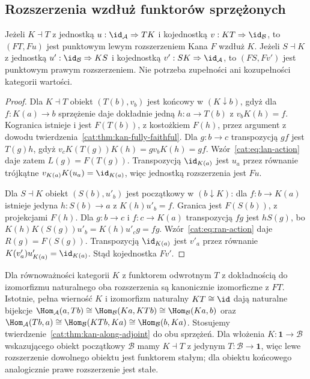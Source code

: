\subsection{Rozszerzenia wzdłuż funktorów sprzężonych}
\begin{twierdzenie}\label{cat:thm:kan-along-adjoint}
Jeżeli $K\dashv T$ z jednostką $u:\id_{\mathcal A}\Rightarrow TK$ i kojednostką $v:KT\Rightarrow\id_{\mathcal B}$, to $(FT,Fu)$ jest punktowym lewym rozszerzeniem Kana $F$ wzdłuż $K$. Jeżeli $S\dashv K$ z jednostką $u':\id_{\mathcal B}\Rightarrow KS$ i kojednostką $v':SK\Rightarrow\id_{\mathcal A}$, to $(FS,Fv')$ jest punktowym prawym rozszerzeniem. Nie potrzeba zupełności ani kozupełności kategorii wartości.
\end{twierdzenie}
\begin{proof}
Dla $K\dashv T$ obiekt $(T(b),v_b)$ jest końcowy w $(K\downarrow b)$, gdyż dla $f:K(a)\to b$ sprzężenie daje dokładnie jedną $h:a\to T(b)$ z $v_bK(h)=f$. Kogranica istnieje i jest $F(T(b))$, z kostożkiem $F(h)$, przez argument z dowodu twierdzenia~\ref{cat:thm:kan-fully-faithful}. Dla $g:b\to c$ transpozycją $gf$ jest $T(g)h$, gdyż $v_cK(T(g))K(h)=gv_bK(h)=gf$. Wzór~\eqref{cat:eq:lan-action} daje zatem $L(g)=F(T(g))$. Transpozycją $\id_{K(a)}$ jest $u_a$ przez równanie trójkątne $v_{K(a)}K(u_a)=\id_{K(a)}$, więc jednostką rozszerzenia jest $Fu$.

Dla $S\dashv K$ obiekt $(S(b),u'_b)$ jest początkowy w $(b\downarrow K)$: dla $f:b\to K(a)$ istnieje jedyna $h:S(b)\to a$ z $K(h)u'_b=f$. Granica jest $F(S(b))$, z projekcjami $F(h)$. Dla $g:b\to c$ i $f:c\to K(a)$ transpozycją $fg$ jest $hS(g)$, bo $K(h)K(S(g))u'_b=K(h)u'_cg=fg$. Wzór~\eqref{cat:eq:ran-action} daje $R(g)=F(S(g))$. Transpozycją $\id_{K(a)}$ jest $v'_a$ przez równanie $K(v'_a)u'_{K(a)}=\id_{K(a)}$. Stąd kojednostka $Fv'$.
\end{proof}
\begin{przyklad}
Dla równoważności kategorii $K$ z funktorem odwrotnym $T$ z dokładnością do izomorfizmu naturalnego oba rozszerzenia są kanonicznie izomorficzne z $FT$. Istotnie, pełna wierność $K$ i izomorfizm naturalny $KT\cong\id$ dają naturalne bijekcje $\Hom_{\mathcal A}(a,Tb)\cong\Hom_{\mathcal B}(Ka,KTb)\cong\Hom_{\mathcal B}(Ka,b)$ oraz $\Hom_{\mathcal A}(Tb,a)\cong\Hom_{\mathcal B}(KTb,Ka)\cong\Hom_{\mathcal B}(b,Ka)$. Stosujemy twierdzenie~\ref{cat:thm:kan-along-adjoint} do obu sprzężeń. Dla włożenia $K:\mathbf1\to\mathcal B$ wskazującego obiekt początkowy $\mathcal B$ mamy $K\dashv T$ z jedynym $T:\mathcal B\to\mathbf1$, więc lewe rozszerzenie dowolnego obiektu jest funktorem stałym; dla obiektu końcowego analogicznie prawe rozszerzenie jest stałe.
\end{przyklad}

